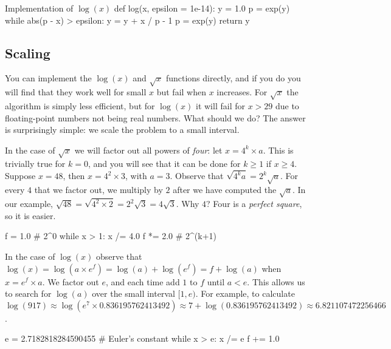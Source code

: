 \begin{pylisting}{Implementation of $\log(x)$}
def log(x, epsilon = 1e-14):
    y = 1.0
    p = exp(y)
    while abs(p - x) > epsilon:
        y = y + x / p - 1
        p = exp(y)
    return y
\end{pylisting}

\subsection{Scaling}
You can implement the $\log(x)$ and $\sqrt{x}$ functions directly, and if you do
you will find that they work well for small $x$ but fail when $x$ increases. For
$\sqrt{x}$ the algorithm is simply less efficient, but for $\log(x)$ it will
fail for $x> 29$ due to floating-point numbers not being real numbers. What
should we do? The answer is surprisingly simple: we scale the problem to a small
interval.

In the case of $\sqrt{x}$ we will factor out all powers of \emph{four}:
let $x = 4^k \times a $. This is trivially true for $k=0$, and you will
see that it can be done for $k\ge 1$ if $x\ge 4$. Suppose $x=48$, then
$x = 4^2\times 3$, with $a=3$. Observe that $\sqrt{4^k a} =
2^k\sqrt{a}$. For every $4$ that we factor out, we multiply by $2$
after we have computed the $\sqrt{a}$. In our example,
$\sqrt{48} = \sqrt{4^2\times 2} = 2^2\sqrt{3}= 4\sqrt{3}$. Why $4$? Four is a
\emph{perfect square}, so it is easier.

\begin{pylisting}{}
f = 1.0 # 2^0
while x > 1:
    x /= 4.0
    f *= 2.0 # 2^(k+1)
\end{pylisting}

In the case of $\log(x)$ observe that $\log(x) = \log(a\times e^f
) = \log(a) + \log(e^f)  = f + \log(a)$ when $x = e^f\times a$. We factor out $e$, and
each time add $1$ to $f$ until $a<e$. This allows us to search for
$\log(a)$ over the small interval $[1, e)$.  For example, to calculate
$\log(917) \approx \log(e^7 \times 0.836195762413492) \approx 7 +
\log(0.836195762413492) \approx 6.821107472256466$.

\begin{pylisting}{}
e = 2.7182818284590455 # Euler's constant
while x > e:
    x /= e
    f += 1.0
\end{pylisting}
